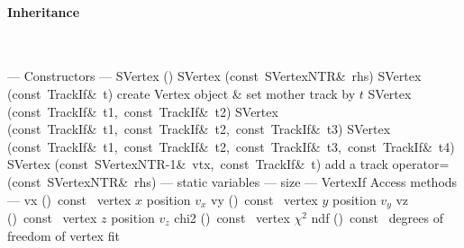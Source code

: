 \documentclass{article}
\begin{document}
\begin{cxxentry}
\begin{cxxclass}
\begin{cxxInheritance}
\paragraph{Inheritance}\strut\smallskip\strut\\
\end{cxxInheritance}
\begin{cxxpublic}
\cxxitem{}
        {--- Constructors --- }
        {}
        {}
        {}
\label{cxx.2.1.2}
\cxxitem{}
        {SVertex}
        {()}
        {}
        {}
\label{cxx.2.1.3}
\cxxitem{}
        {SVertex}
        {(const\ SVertex\<NTR\>\&\ rhs)}
        {}
        {}
\label{cxx.2.1.4}
\cxxitem{}
        {SVertex}
        {(const\ TrackIf\&\ t)}
        { create Vertex object \& set mother track by $t$}
        {}
\label{cxx.2.1.5}
\cxxitem{}
        {SVertex}
        {(const\ TrackIf\&\ t1,\ const\ TrackIf\&\ t2)}
        {}
        {}
\label{cxx.2.1.6}
\cxxitem{}
        {SVertex}
        {(const\ TrackIf\&\ t1,\ const\ TrackIf\&\ t2,\ const\ TrackIf\&\ t3)}
        {}
        {}
\label{cxx.2.1.7}
\cxxitem{}
        {SVertex}
        {(const\ TrackIf\&\ t1,\ const\ TrackIf\&\ t2,\ const\ TrackIf\&\ t3,\ const\ TrackIf\&\ t4)}
        {}
        {}
\label{cxx.2.1.8}
\cxxitem{}
        {SVertex}
        {(const\ SVertex\<NTR-1\>\&\ vtx,\ const\ TrackIf\&\ t)}
        { add a track}
        {}
\label{cxx.2.1.9}
        {operator=}
        {(const\ SVertex\<NTR\>\&\ rhs)}
        {}
        {}
\label{cxx.2.1.10}
\cxxitem{}
        {--- static variables --- }
        {}
        {}
        {}
\label{cxx.2.1.11}
        {size}
        {}
        {}
        {}
\label{cxx.2.1.12}
\cxxitem{}
        {--- VertexIf Access methods --- }
        {}
        {}
        {}
\label{cxx.2.1.13}
        {vx}
        {()\ const\ }
        { vertex $x$ position $v_x$}
        {}
\label{cxx.2.1.14}
        {vy}
        {()\ const\ }
        { vertex $y$ position $v_y$}
        {}
\label{cxx.2.1.15}
        {vz}
        {()\ const\ }
        { vertex $z$ position $v_z$}
        {}
\label{cxx.2.1.16}
        {chi2}
        {()\ const\ }
        { vertex $\chi^2$}
        {}
\label{cxx.2.1.17}
        {ndf}
        {()\ const\ }
        { degrees of freedom of vertex fit}
        {}
\label{cxx.2.1.18}

\end{cxxpublic}
\end{cxxclass}
\end{cxxentry}
\end{document}

